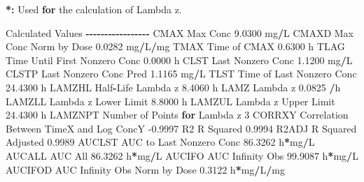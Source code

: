 \documentclass[
  12pt,
]{krantz}
\newenvironment{Shaded}{\begin{snugshade}}{\end{snugshade}}
\newcommand{\ControlFlowTok}[1]{\textcolor[rgb]{0.13,0.29,0.53}{\textbf{#1}}}
\newcommand{\DecValTok}[1]{\textcolor[rgb]{0.00,0.00,0.81}{#1}}
\newcommand{\ErrorTok}[1]{\textcolor[rgb]{0.64,0.00,0.00}{\textbf{#1}}}
\newcommand{\FloatTok}[1]{\textcolor[rgb]{0.00,0.00,0.81}{#1}}
\newcommand{\NormalTok}[1]{#1}
\newcommand{\OperatorTok}[1]{\textcolor[rgb]{0.81,0.36,0.00}{\textbf{#1}}}
\newcommand{\StringTok}[1]{\textcolor[rgb]{0.31,0.60,0.02}{#1}}
\begin{document}
\begin{Shaded}
\begin{Highlighting}[]
\OperatorTok{*}\ErrorTok{:}\StringTok{ }\NormalTok{Used }\ControlFlowTok{for}\NormalTok{ the calculation of Lambda z.}


\NormalTok{Calculated Values}
\OperatorTok{{-}{-}{-}{-}{-}{-}{-}{-}{-}{-}{-}{-}{-}{-}{-}{-}{-}}
\NormalTok{CMAX       Max Conc                                        }\FloatTok{9.0300}\NormalTok{ mg}\OperatorTok{/}\NormalTok{L}
\NormalTok{CMAXD      Max Conc Norm by Dose                           }\FloatTok{0.0282}\NormalTok{ mg}\OperatorTok{/}\NormalTok{L}\OperatorTok{/}\NormalTok{mg}
\NormalTok{TMAX       Time of CMAX                                    }\FloatTok{0.6300}\NormalTok{ h}
\NormalTok{TLAG       Time Until First Nonzero Conc                   }\FloatTok{0.0000}\NormalTok{ h}
\NormalTok{CLST       Last Nonzero Conc                               }\FloatTok{1.1200}\NormalTok{ mg}\OperatorTok{/}\NormalTok{L}
\NormalTok{CLSTP      Last Nonzero Conc Pred                          }\FloatTok{1.1165}\NormalTok{ mg}\OperatorTok{/}\NormalTok{L}
\NormalTok{TLST       Time of Last Nonzero Conc                      }\FloatTok{24.4300}\NormalTok{ h}
\NormalTok{LAMZHL     Half}\OperatorTok{{-}}\NormalTok{Life Lambda z                              }\FloatTok{8.4060}\NormalTok{ h}
\NormalTok{LAMZ       Lambda z                                        }\FloatTok{0.0825} \OperatorTok{/}\NormalTok{h}
\NormalTok{LAMZLL     Lambda z Lower Limit                            }\FloatTok{8.8000}\NormalTok{ h}
\NormalTok{LAMZUL     Lambda z Upper Limit                           }\FloatTok{24.4300}\NormalTok{ h}
\NormalTok{LAMZNPT    Number of Points }\ControlFlowTok{for}\NormalTok{ Lambda z                   }\DecValTok{3}
\NormalTok{CORRXY     Correlation Between TimeX and Log ConcY        }\FloatTok{{-}0.9997} 
\NormalTok{R2         R Squared                                       }\FloatTok{0.9994} 
\NormalTok{R2ADJ      R Squared Adjusted                              }\FloatTok{0.9989} 
\NormalTok{AUCLST     AUC to Last Nonzero Conc                       }\FloatTok{86.3262}\NormalTok{ h}\OperatorTok{*}\NormalTok{mg}\OperatorTok{/}\NormalTok{L}
\NormalTok{AUCALL     AUC All                                        }\FloatTok{86.3262}\NormalTok{ h}\OperatorTok{*}\NormalTok{mg}\OperatorTok{/}\NormalTok{L}
\NormalTok{AUCIFO     AUC Infinity Obs                               }\FloatTok{99.9087}\NormalTok{ h}\OperatorTok{*}\NormalTok{mg}\OperatorTok{/}\NormalTok{L}
\NormalTok{AUCIFOD    AUC Infinity Obs Norm by Dose                   }\FloatTok{0.3122}\NormalTok{ h}\OperatorTok{*}\NormalTok{mg}\OperatorTok{/}\NormalTok{L}\OperatorTok{/}\NormalTok{mg}

\end{Highlighting}
\end{Shaded}
\end{document}

